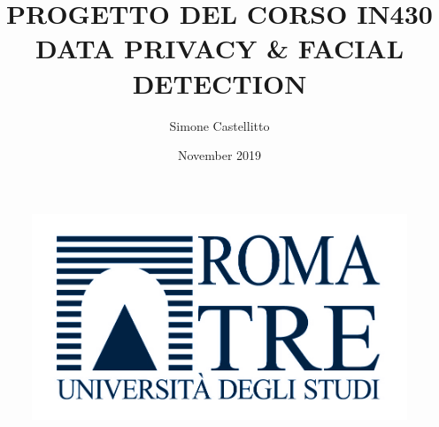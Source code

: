 \documentclass{article}
\title{PROGETTO DEL CORSO IN430 \\ DATA PRIVACY \& FACIAL DETECTION}
\author{Simone Castellitto}
\date{November 2019}
\begin{document}
\begin{figure}
    \centering
    \includegraphics{images/Logo_Roma_Tre.jpg}
    \label{fig:my_label}
\end{figure}
\maketitle
\newpage
\end{document}
